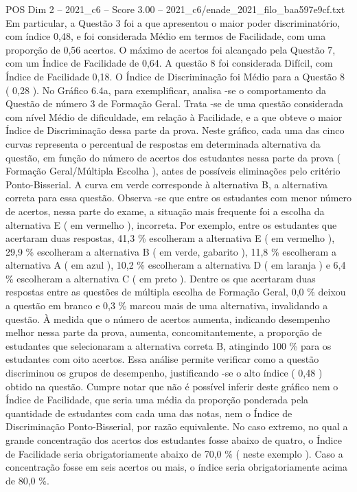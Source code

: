 \begin{textsample}{POS Dim 2 – 2021\_c6 – Score 3.00 – 2021\_c6/enade\_2021\_filo\_baa597e9cf.txt}
Em particular, a Questão 3 foi a que apresentou o maior poder discriminatório, com índice 0,48, e foi considerada Médio em termos de Facilidade, com uma proporção de 0,56 acertos.
O máximo de acertos foi alcançado pela Questão 7, com um Índice de Facilidade de 0,64.
A questão 8 foi considerada Difícil, com Índice de Facilidade 0,18.
O Índice de Discriminação foi Médio para a Questão 8 ( 0,28 ).
No Gráfico 6.4a, para exemplificar, analisa -se o comportamento da Questão de número 3 de Formação Geral.
Trata -se de uma questão considerada com nível Médio de dificuldade, em relação à Facilidade, e a que obteve o maior Índice de Discriminação dessa parte da prova.
Neste gráfico, cada uma das cinco curvas representa o percentual de respostas em determinada alternativa da questão, em função do número de acertos dos estudantes nessa parte da prova ( Formação Geral/Múltipla Escolha ), antes de possíveis eliminações pelo critério Ponto-Bisserial.
A curva em verde corresponde à alternativa B, a alternativa correta para essa questão.
Observa -se que entre os estudantes com menor número de acertos, nessa parte do exame, a situação mais frequente foi a escolha da alternativa E ( em vermelho ), incorreta.
Por exemplo, entre os estudantes que acertaram duas respostas, 41,3 \% escolheram a alternativa E ( em vermelho ), 29,9 \% escolheram a alternativa B ( em verde, gabarito ), 11,8 \% escolheram a alternativa A ( em azul ), 10,2 \% escolheram a alternativa D ( em laranja ) e 6,4 \% escolheram a alternativa C ( em preto ).
Dentre os que acertaram duas respostas entre as questões de múltipla escolha de Formação Geral, 0,0 \% deixou a questão em branco e 0,3 \% marcou mais de uma alternativa, invalidando a questão.
À medida que o número de acertos aumenta, indicando desempenho melhor nessa parte da prova, aumenta, concomitantemente, a proporção de estudantes que selecionaram a alternativa correta B, atingindo 100 \% para os estudantes com oito acertos.
Essa análise permite verificar como a questão discriminou os grupos de desempenho, justificando -se o alto índice ( 0,48 ) obtido na questão.
Cumpre notar que não é possível inferir deste gráfico nem o Índice de Facilidade, que seria uma média da proporção ponderada pela quantidade de estudantes com cada uma das notas, nem o Índice de Discriminação Ponto-Bisserial, por razão equivalente.
No caso extremo, no qual a grande concentração dos acertos dos estudantes fosse abaixo de quatro, o Índice de Facilidade seria obrigatoriamente abaixo de 70,0 \% ( neste exemplo ).
Caso a concentração fosse em seis acertos ou mais, o índice seria obrigatoriamente acima de 80,0 \%.

\end{textsample}

